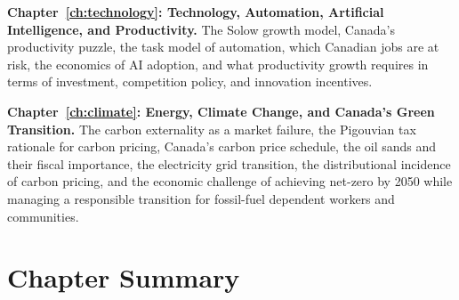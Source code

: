 \textbf{Chapter~\ref{ch:technology}: Technology, Automation, Artificial Intelligence, and Productivity.}
The Solow growth model, Canada's productivity puzzle, the task model of
automation, which Canadian jobs are at risk, the economics of AI adoption,
and what productivity growth requires in terms of investment, competition
policy, and innovation incentives.

\textbf{Chapter~\ref{ch:climate}: Energy, Climate Change, and Canada's Green Transition.}
The carbon externality as a market failure, the Pigouvian tax rationale
for carbon pricing, Canada's carbon price schedule, the oil sands and
their fiscal importance, the electricity grid transition, the distributional
incidence of carbon pricing, and the economic challenge of achieving
net-zero by 2050 while managing a responsible transition for fossil-fuel
dependent workers and communities.

\section*{Chapter Summary}


